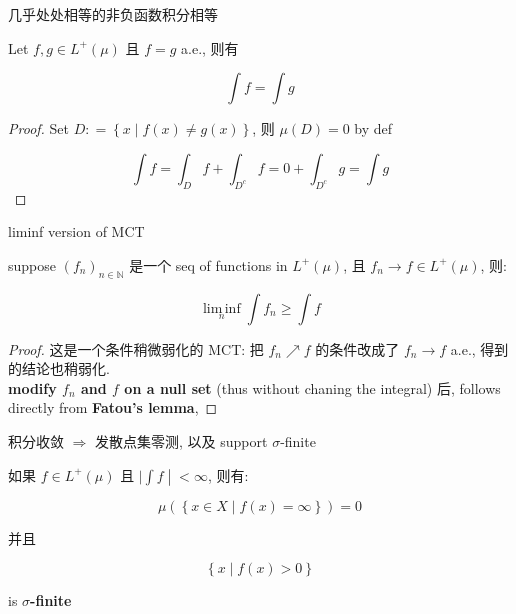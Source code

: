 \documentclass{qlnotes-export}
\begin{document}
\begin{corollary}{几乎处处相等的非负函数积分相等}\label{cor-04-measurable-functions-and-integration-on-l-mu-corollary-006}

Let \(f,g \in L^{+}(\mu)\) 且 \(f = g\) a.e., 则有

\[\int f = \int g\]

\end{corollary}

\begin{proof}

Set \(D: = \left\{ {x \mid f(x) \neq g(x)} \right\}\), 则 \(\mu(D) = 0\) by def

\[\int f = \int_{D}f + \int_{D^{c}}f = 0 + \int_{D^{c}}g = \int g\]

\end{proof}

\begin{corollary}{liminf version of MCT}\label{cor-04-measurable-functions-and-integration-on-l-mu-liminf-version-of-mct}

suppose \((f_{n})_{n \in {\mathbb{N}}}\) 是一个 seq of functions in \(L^{+}(\mu)\), 且 \(f_{n}\rightarrow f \in L^{+}(\mu)\), 则:

\[\operatorname{lim\, inf}\limits_{n}\int f_{n} \geq \int f\]

\end{corollary}

\begin{proof}

这是一个条件稍微弱化的 MCT: 把 \(f_{n}\operatorname{\nearrow ︎}f\) 的条件改成了 \(f_{n}\rightarrow f\) a.e., 得到的结论也稍弱化.\\
\textbf{modify \(f_{n}\) and \(f\) on a null set} (thus without chaning the integral) 后, follows directly from \textbf{Fatou's lemma},

\end{proof}

\begin{theorem}{积分收敛 \(\Longrightarrow\) 发散点集零测, 以及 support
\(\sigma\)-finite}\label{thm-04-measurable-functions-and-integration-on-l-mu-implies-support-sigma-finite}

如果 \(f \in L^{+}(\mu)\) 且 \(\left. |\int f \middle| < \infty \right.\), 则有:

\[\mu(\left\{ {x \in X \mid f(x) = \infty} \right\}) = 0\]

并且

\[\left\{ {x \mid f(x) > 0} \right\}\]

is \textbf{\(\sigma\)-finite}

\end{theorem}
\end{document}
